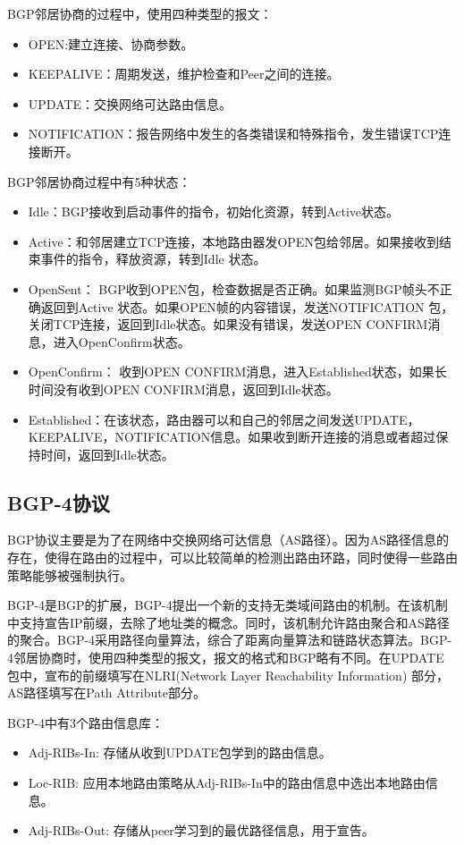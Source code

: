 BGP邻居协商的过程中，使用四种类型的报文：

\begin{itemize}
\item OPEN:建立连接、协商参数。
\item KEEPALIVE：周期发送，维护检查和Peer之间的连接。
\item UPDATE：交换网络可达路由信息。
\item NOTIFICATION：报告网络中发生的各类错误和特殊指令，发生错误TCP连接断开。
\end{itemize}

BGP邻居协商过程中有5种状态：

\begin{itemize}
\item Idle：BGP接收到启动事件的指令，初始化资源，转到Active状态。
\item Active：和邻居建立TCP连接，本地路由器发OPEN包给邻居。如果接收到结束事件的指令，释放资源，转到Idle 状态。
\item OpenSent： BGP收到OPEN包，检查数据是否正确。如果监测BGP帧头不正确返回到Active 状态。如果OPEN帧的内容错误，发送NOTIFICATION 包，关闭TCP连接，返回到Idle状态。如果没有错误，发送OPEN CONFIRM消息，进入OpenConfirm状态。
\item OpenConfirm： 收到OPEN CONFIRM消息，进入Established状态，如果长时间没有收到OPEN CONFIRM消息，返回到Idle状态。
\item Established：在该状态，路由器可以和自己的邻居之间发送UPDATE，KEEPALIVE，NOTIFICATION信息。如果收到断开连接的消息或者超过保持时间，返回到Idle状态。
\end{itemize}



\subsection{BGP-4协议}
BGP协议主要是为了在网络中交换网络可达信息（AS路径）。因为AS路径信息的存在，使得在路由的过程中，可以比较简单的检测出路由环路，同时使得一些路由策略能够被强制执行。

BGP-4\cite{RFCBGP4}是BGP的扩展，BGP-4提出一个新的支持无类域间路由的机制。在该机制中支持宣告IP前缀，去除了地址类的概念。同时，该机制允许路由聚合和AS路径的聚合。BGP-4采用路径向量算法，综合了距离向量算法和链路状态算法。BGP-4邻居协商时，使用四种类型的报文，报文的格式和BGP略有不同。在UPDATE 包中，宣布的前缀填写在NLRI(Network Layer Reachability Information) 部分，AS路径填写在Path Attribute部分。

BGP-4中有3个路由信息库：
\begin{itemize}
\item Adj-RIBs-In: 存储从收到UPDATE包学到的路由信息。
\item Loc-RIB: 应用本地路由策略从Adj-RIBs-In中的路由信息中选出本地路由信息。
\item Adj-RIBs-Out: 存储从peer学习到的最优路径信息，用于宣告。
\end{itemize}

